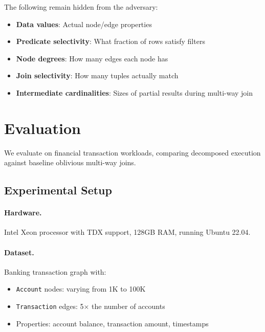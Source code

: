 The following remain hidden from the adversary:
\begin{itemize}
    \item \textbf{Data values}: Actual node/edge properties
    \item \textbf{Predicate selectivity}: What fraction of rows satisfy filters
    \item \textbf{Node degrees}: How many edges each node has
    \item \textbf{Join selectivity}: How many tuples actually match
    \item \textbf{Intermediate cardinalities}: Sizes of partial results during multi-way join
\end{itemize}


\section{Evaluation}
\label{sec:evaluation}

We evaluate \system on financial transaction workloads, comparing decomposed execution against baseline oblivious multi-way joins.

\subsection{Experimental Setup}
\label{sec:evaluation:setup}

\paragraph{Hardware.}
Intel Xeon processor with TDX support, 128GB RAM, running Ubuntu 22.04.

\paragraph{Dataset.}
Banking transaction graph with:
\begin{itemize}
    \item \texttt{Account} nodes: varying from 1K to 100K
    \item \texttt{Transaction} edges: 5$\times$ the number of accounts
    \item Properties: account balance, transaction amount, timestamps
\end{itemize}

